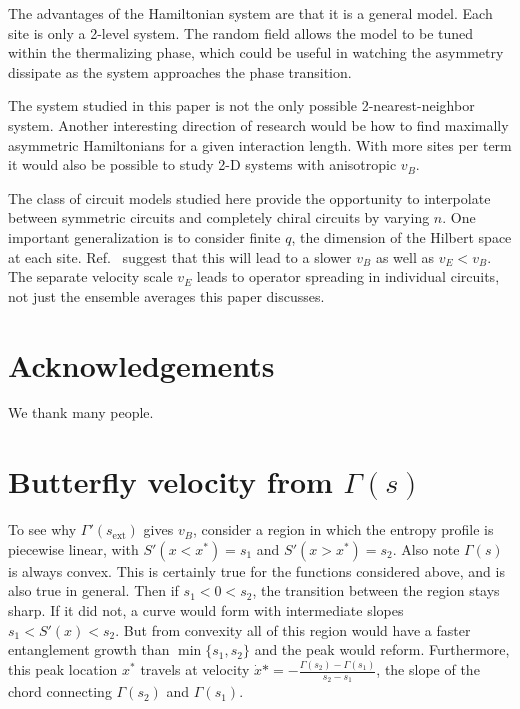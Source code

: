 \documentclass[aps,prx,reprint,superscriptaddress, longbibliography]{revtex4-1}
\newcommand{\charlie}[1]{{\color{Magenta}{{#1}}}}
\begin{document}
The advantages of the Hamiltonian system are that it is a general model. Each site is only a 2-level system. The random field allows the model to be tuned within the thermalizing phase, which could be useful in watching the asymmetry dissipate as the system approaches the phase transition. 

The system studied in this paper is not the only possible 2-nearest-neighbor system. Another interesting direction of research would be how to find maximally asymmetric Hamiltonians for a given interaction length. With more sites per term it would also be possible to study 2-D systems with anisotropic $v_B$.

The class of circuit models studied here provide the opportunity to interpolate between symmetric circuits and completely chiral circuits by varying $n$. One important generalization is to consider finite $q$, the dimension of the Hilbert space at each site. Ref.~\cite{KeyserlingkHydro} suggest that this will lead to a slower $v_B$ as well as $v_E<v_B$. The separate velocity scale $v_E$ leads to operator spreading in individual circuits, not just the ensemble averages this paper discusses.


\section*{Acknowledgements}
We thank many people.

\charlie{Note somewhere about arXiv:1809.02614v1}

\appendix
	
\section{Butterfly velocity from $\Gamma(s)$}

To see why $\Gamma'(s_\text{ext})$ gives $v_B$, consider a region in which the entropy profile is piecewise linear, with $S'(x<x^*)=s_1$ and $S'(x>x^*)=s_2$. Also note $\Gamma(s)$ is always convex. This is certainly true for the functions considered above, and is also true in general. Then if $s_1<0<s_2$, the transition between the region stays sharp. If it did not, a curve would form with intermediate slopes $s_1<S'(x)<s_2$. But from convexity all of this region would have a faster entanglement growth than $\min\{s_1,s_2\}$ and the peak would reform. Furthermore, this peak location $x^*$ travels at velocity $\dot{x}*=-\frac{\Gamma(s_2)-\Gamma(s_1)}{s_2-s_1}$, the slope of the chord connecting $\Gamma(s_2)$ and $\Gamma(s_1)$.
\end{document}
